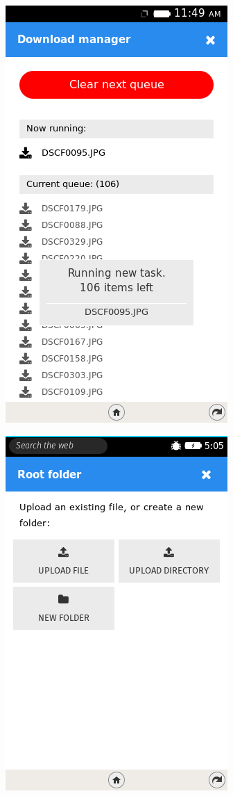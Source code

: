 \documentclass{beamer}
\begin{document}
\begin{frame}
\begin{center}
\includegraphics[scale=0.5] {./images/TFEDrive06.png} 
\end{center}
\end{frame}
\begin{frame}
\begin{center}
\includegraphics[scale=0.5] {./images/TFEDrive07.png} 
\end{center}
\end{frame}
\end{document}
